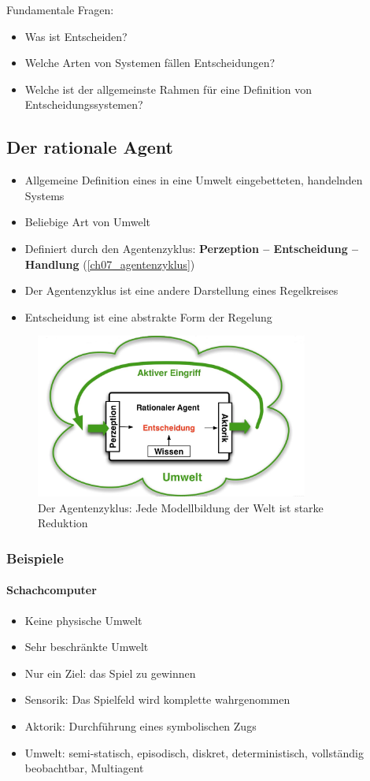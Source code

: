 Fundamentale Fragen:
\begin{itemize}
	\item Was ist Entscheiden?
	\item Welche Arten von Systemen fällen Entscheidungen?
	\item Welche ist der allgemeinste Rahmen für eine Definition von Entscheidungssystemen?
\end{itemize}

\subsection{Der rationale Agent}
\begin{itemize}
	\item Allgemeine Definition eines in eine Umwelt eingebetteten, handelnden Systems
	\item Beliebige Art von Umwelt
	\item Definiert durch den Agentenzyklus: \textbf{Perzeption -- Entscheidung -- Handlung} (\autoref{ch07_agentenzyklus})
	\item Der Agentenzyklus ist eine andere Darstellung eines Regelkreises
	\item Entscheidung ist eine abstrakte Form der Regelung
\end{itemize}

\begin{figure}[ht]\centering 
\includegraphics[width=0.8\textwidth]{figures/07_agentenzyklus.png}
\caption{Der Agentenzyklus: Jede Modellbildung der Welt ist starke Reduktion}
\label{ch07_agentenzyklus}
\end{figure}

\subsubsection{Beispiele}
\paragraph{Schachcomputer}
\begin{itemize}
	\item Keine physische Umwelt
	\item Sehr beschränkte Umwelt
	\item Nur ein Ziel: das Spiel zu gewinnen
	\item Sensorik: Das Spielfeld wird komplette wahrgenommen
	\item Aktorik: Durchführung eines symbolischen Zugs
	\item Umwelt: semi-statisch, episodisch, diskret, deterministisch, vollständig beobachtbar, Multiagent
\end{itemize}
